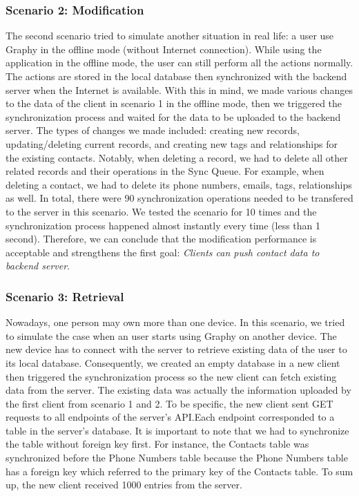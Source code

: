\subsubsection{Scenario 2: Modification}
The second scenario tried to simulate another situation in real life: a user use Graphy in the offline mode (without Internet connection). While using the application in the offline mode, the user can still perform all the actions normally. The actions are stored in the local database then synchronized with the backend server when the Internet is available. With this in mind, we made various changes to the data of the client in scenario 1 in the offline mode, then we triggered the synchronization process and waited for the data to be uploaded to the backend server. The types of changes we made included: creating new records, updating/deleting current records, and creating new tags and relationships for the existing contacts. Notably, when deleting a record, we had to delete all other related records and their operations in the Sync Queue. For example, when deleting a contact, we had to delete its phone numbers, emails, tags, relationships as well. In total, there were 90 synchronization operations needed to be transfered to the server in this scenario. We tested the scenario for 10 times and the synchronization process happened almost instantly every time (less than 1 second). Therefore, we can conclude that the modification performance is acceptable and strengthens the first goal: \textit{Clients can push contact data to backend server}.

\subsubsection{Scenario 3: Retrieval}
Nowadays, one person may own more than one device. In this scenario, we tried to simulate the case when an user starts using Graphy on another device. The new device has to connect with the server to retrieve existing data of the user to its local database. Consequently, we created an empty database in a new client then triggered the synchronization process so the new client can fetch existing data from the server. The existing data was actually the information uploaded by the first client from scenario 1 and 2. To be specific, the new client sent GET requests to all endpoints of the server's API.Each endpoint corresponded to a table in the server's database. It is important to note that we had to synchronize the table without foreign key first. For instance, the Contacts table was synchronized before the Phone Numbers table because the Phone Numbers table has a foreign key which referred to the primary key of the Contacts table. To sum up, the new client received 1000 entries from the server.

